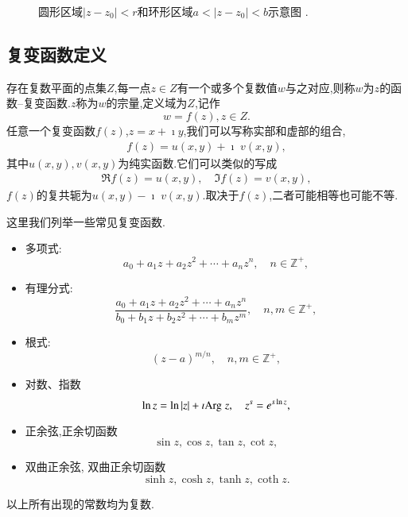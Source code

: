 \begin{figure}
    \centering

    
    \caption{圆形区域$\left|z-z_0\right|<r$和环形区域$a<\left|z-z_0\right|<b$示意图 .}
    \label{fig:annular}
\end{figure}


\subsection{复变函数定义}
\label{sub:cmplx_func_def}

存在复数平面的点集$Z$,每一点$z\in Z$有一个或多个复数值$w$与之对应,则称$w$为$z$的函数--复变函数.$z$称为$w$的宗量,定义域为$Z$,记作
\begin{equation}
    w = f(z), z\in Z .
\end{equation}
任意一个复变函数$f(z)$,$z=x + \imath y$,我们可以写称实部和虚部的组合,
\begin{align}
    f(z) = u(x,y) +\imath \; v(x,y) ,
\end{align}
其中$u(x,y), v(x,y)$为纯实函数.它们可以类似的写成
\begin{align}
    \Re f(z) = u(x,y), \quad \Im f(z) = v(x,y) ,
\end{align}
$f(z)$的复共轭为$u(x,y) - \imath \; v(x,y)$.取决于$f(z)$,二者可能相等也可能不等.

这里我们列举一些常见复变函数.
\begin{itemize}
    \item 多项式:
        \begin{equation}
            a_0 + a_1 z + a_2 z^2 + \cdots + a_n z^n , \quad n\in \mathbb{Z}^+ ,
        \end{equation}
    \item 有理分式:       
         \begin{equation}
        \frac{a_0 + a_1 z + a_2 z^2 + \cdots + a_n z^n}{{b_0 + b_1 z + b_2 z^2 + \cdots + b_m z^m}} , \quad  n,m\in \mathbb{Z}^+ ,
        \end{equation}
    \item 根式:
        \begin{equation}
            (z-a)^{m/n} , \quad  n,m\in \mathbb{Z}^+ ,
        \end{equation}
    \item 对数、指数
        \begin{equation}
            \ln z = \ln |z| + \imath {\mathrm{Arg}\;} z, \quad z^s = e^{s\ln z} ,
        \end{equation}
    \item 正余弦,正余切函数 
        \begin{equation}
            \sin z , \cos z , \tan z, \cot z ,
        \end{equation}
    \item 双曲正余弦, 双曲正余切函数
        \begin{equation}
            \sinh z , \cosh z , \tanh z, \coth z  .
        \end{equation}
\end{itemize}
以上所有出现的常数均为复数.

